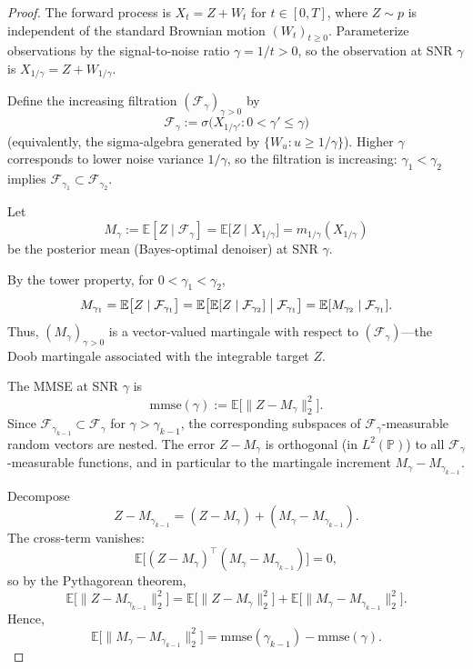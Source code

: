 \documentclass[11pt]{article}
\theoremstyle{definition}
\numberwithin{equation}{section}
\begin{document}
\begin{proof}
The forward process is $X_t = Z + W_t$ for $t \in [0, T]$, where $Z \sim p$ is independent of the standard Brownian motion $(W_t)_{t \geq 0}$. Parameterize observations by the signal-to-noise ratio $\gamma = 1/t > 0$, so the observation at SNR $\gamma$ is $X_{1/\gamma} = Z + W_{1/\gamma}$.

Define the increasing filtration $(\mathcal{F}_\gamma)_{\gamma > 0}$ by
\[
\mathcal{F}_\gamma := \sigma\bigl( X_{1/\gamma'} : 0 < \gamma' \leq \gamma \bigr)
\]
(equivalently, the sigma-algebra generated by $\{W_u : u \geq 1/\gamma\}$). Higher $\gamma$ corresponds to lower noise variance $1/\gamma$, so the filtration is increasing: $\gamma_1 < \gamma_2$ implies $\mathcal{F}_{\gamma_1} \subset \mathcal{F}_{\gamma_2}$.

Let
\[
M_\gamma := \mathbb{E}[Z \mid \mathcal{F}_\gamma] = \mathbb{E}\bigl[ Z \mid X_{1/\gamma} \bigr] = m_{1/\gamma}(X_{1/\gamma})
\]
be the posterior mean (Bayes-optimal denoiser) at SNR $\gamma$.

By the tower property, for $0 < \gamma_1 < \gamma_2$,
\[
M_{\gamma_1} = \mathbb{E}\bigl[ Z \mid \mathcal{F}_{\gamma_1} \bigr] = \mathbb{E} \bigl[ \mathbb{E}[Z \mid \mathcal{F}_{\gamma_2}] \bigm| \mathcal{F}_{\gamma_1} \bigr] = \mathbb{E}[ M_{\gamma_2} \mid \mathcal{F}_{\gamma_1} ].
\]
Thus, $(M_\gamma)_{\gamma > 0}$ is a vector-valued martingale with respect to $(\mathcal{F}_\gamma)$---the Doob martingale associated with the integrable target $Z$.

The MMSE at SNR $\gamma$ is
\[
\mathrm{mmse}(\gamma) := \mathbb{E} \bigl[ \|Z - M_\gamma\|_2^2 \bigr].
\]
Since $\mathcal{F}_{\gamma_{k-1}} \subset \mathcal{F}_\gamma$ for $\gamma > \gamma_{k-1}$, the corresponding subspaces of $\mathcal{F}_\gamma$-measurable random vectors are nested. The error $Z - M_\gamma$ is orthogonal (in $L^2(\mathbb{P})$) to all $\mathcal{F}_\gamma$-measurable functions, and in particular to the martingale increment $M_\gamma - M_{\gamma_{k-1}}$.

Decompose
\[
Z - M_{\gamma_{k-1}} = (Z - M_\gamma) + (M_\gamma - M_{\gamma_{k-1}}).
\]
The cross-term vanishes:
\[
\mathbb{E} \bigl[ (Z - M_\gamma)^\top (M_\gamma - M_{\gamma_{k-1}}) \bigr] = 0,
\]
so by the Pythagorean theorem,
\[
\mathbb{E} \bigl[ \|Z - M_{\gamma_{k-1}}\|_2^2 \bigr] = \mathbb{E} \bigl[ \|Z - M_\gamma\|_2^2 \bigr] + \mathbb{E} \bigl[ \|M_\gamma - M_{\gamma_{k-1}}\|_2^2 \bigr].
\]
Hence,
\begin{equation}\label{eq:mmsedif}
\mathbb{E} \bigl[ \|M_\gamma - M_{\gamma_{k-1}}\|_2^2 \bigr] = \mathrm{mmse}(\gamma_{k-1}) - \mathrm{mmse}(\gamma). 
\end{equation}


\end{proof}
\end{document}
